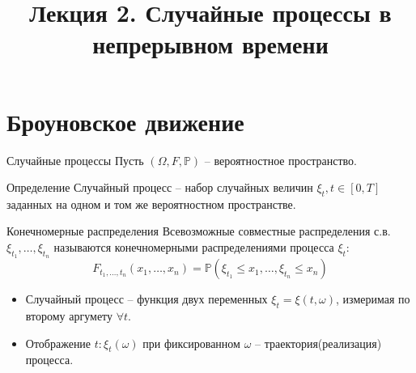 \documentclass{beamer}
\title[Случайные процессы]{Лекция 2. Случайные процессы в непрерывном времени} %
\begin{document}
\begin{frame}
\titlepage 
\end{frame}

\section{Броуновское движение}

\begin{frame}{Случайные процессы}
    Пусть $(\Omega, F, \mathbb{P})$ -- вероятностное пространство.
    \begin{block}{Определение}
    Случайный процесс -- набор случайных величин $\xi_t, t \in [0, T]$ заданных на одном и том же вероятностном пространстве.     
    \end{block}
    
    \begin{block}{Конечномерные распределения}
        Всевозможные совместные распределения с.в. $\xi_{t_1}, \ldots, \xi_{t_n}$ называются конечномерными распределениями процесса $\xi_t$:
        $$
            F_{t_1, \ldots, t_n} (x_1, \ldots, x_n) = \mathbb{P}(\xi_{t_1} \leq x_1, \ldots, \xi_{t_n} \leq x_n)
        $$
    \end{block}

    \begin{itemize}
        \item Случайный процесс -- функция двух переменных $\xi_t = \xi(t, \omega)$, измеримая по второму аргумету $\forall t$.
        \item Отображение $t : \xi_t(\omega)$ при фиксированном $\omega$ -- траектория(реализация) процесса.
    \end{itemize}
\end{frame}
\end{document}
